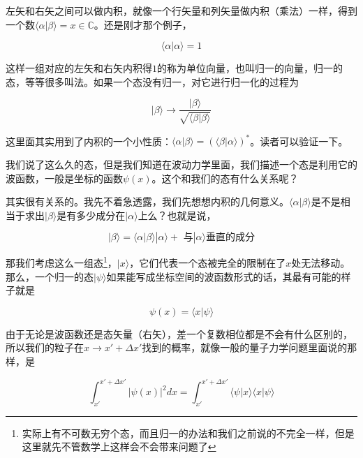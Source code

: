 左矢和右矢之间可以做内积，就像一个行矢量和列矢量做内积（乘法）一样，得到一个数$\langle\alpha|\beta\rangle = x \in \mathbb{C}$。还是刚才那个例子，

\begin{exam}{}
\begin{equation}
\langle\alpha|\alpha\rangle = 1
\end{equation}
\end{exam}

这样一组对应的左矢和右矢内积得$1$的称为单位向量，也叫归一的向量，归一的态，等等很多叫法。如果一个态没有归一，对它进行归一化的过程为

\begin{equation}
|\beta\rangle\rightarrow\frac{|\beta\rangle}{\sqrt{\langle\beta|\beta\rangle}}
\end{equation}

这里面其实用到了内积的一个小性质：$\langle\alpha|\beta\rangle = (\langle\beta|\alpha\rangle)^*$。读者可以验证一下。

我们说了这么久的态，但是我们知道在波动力学里面，我们描述一个态是利用它的波函数，一般是坐标的函数$\psi(x)$。这个和我们的态有什么关系呢？

其实很有关系的。我先不着急透露，我们先想想内积的几何意义。$\langle\alpha|\beta\rangle$是不是相当于求出$|\beta\rangle$是有多少成分在$|\alpha\rangle$上么？也就是说，

\begin{equation}
|\beta\rangle = \langle\alpha|\beta\rangle|\alpha\rangle + \text{ 与}|\alpha\rangle\text{垂直的成分} 
\end{equation}

那我们考虑这么一组态\footnote{实际上有不可数无穷个态，而且归一的办法和我们之前说的不完全一样，但是这里就先不管数学上这样会不会带来问题了}，$|x\rangle$，它们代表一个态被完全的限制在了$x$处无法移动。那么，一个归一的态$|\psi\rangle$如果能写成坐标空间的波函数形式的话，其最有可能的样子就是

\begin{equation}
\psi(x) = \langle x|\psi\rangle
\end{equation}

由于无论是波函数还是态矢量（右矢），差一个复数相位都是不会有什么区别的，所以我们的粒子在$x\rightarrow x'+\Delta x'$找到的概率，就像一般的量子力学问题里面说的那样，是

\begin{equation}
\int_{x'}^{x'+\Delta x'}|\psi(x)|^2 dx = \int_{x'}^{x'+\Delta x'} \langle\psi|x\rangle\langle x|\psi\rangle
\end{equation}

